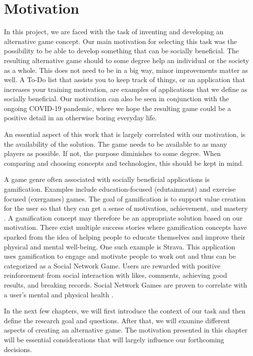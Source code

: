 \documentclass[../Main.tex]{subfiles}
\begin{document}
\section{Motivation}
\label{chap:motivation}
In this project, we are faced with the task of inventing and developing an alternative game concept. Our main motivation for selecting this task was the possibility to be able to develop something that can be socially beneficial. The resulting alternative game should to some degree help an individual or the society as a whole. This does not need to be in a big way, minor improvements matter as well. A To-Do list that assists you to keep track of things, or an application that increases your training motivation, are examples of applications that we define as socially beneficial. Our motivation can also be seen in conjunction with the ongoing COVID-19 pandemic, where we hope the resulting game could be a positive detail in an otherwise boring everyday life. 

An essential aspect of this work that is largely correlated with our motivation, is the availability of the solution. The game needs to be available to as many players as possible. If not, the purpose diminishes to some degree. When comparing and choosing concepts and technologies, this should be kept in mind.

A game genre often associated with socially beneficial applications is gamification. Examples include education-focused (edutainment) and exercise focused (exergames) games. The goal of gamification is to support value creation for the user so that they can get a sense of motivation, achievement, and mastery \cite{hamari_social_2013}. A gamification concept may therefore be an appropriate solution based on our motivation. There exist multiple success stories where gamification concepts have sparked from the idea of helping people to educate themselves and improve their physical and mental well-being. One such example is Strava. This application uses gamification to engage and motivate people to work out and thus can be categorized as a Social Network Game. Users are rewarded with positive reinforcement from social interaction with likes, comments, achieving good results, and breaking records. Social Network Games are proven to correlate with a user’s mental and physical health \citep{pantic_online_2014, mentzoni_problematic_2011}.

In the next few chapters, we will first introduce the context of our task and then define the research goal and questions. After that, we will examine different aspects of creating an alternative game. The motivation presented in this chapter will be essential considerations that will largely influence our forthcoming decisions.


\biblio %
\end{document}
